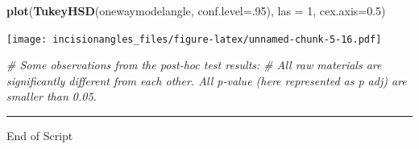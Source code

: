 \documentclass[
]{article}
\newenvironment{Shaded}{\begin{snugshade}}{\end{snugshade}}
\newcommand{\AttributeTok}[1]{\textcolor[rgb]{0.13,0.29,0.53}{#1}}
\newcommand{\CommentTok}[1]{\textcolor[rgb]{0.56,0.35,0.01}{\textit{#1}}}
\newcommand{\DecValTok}[1]{\textcolor[rgb]{0.00,0.00,0.81}{#1}}
\newcommand{\FloatTok}[1]{\textcolor[rgb]{0.00,0.00,0.81}{#1}}
\newcommand{\FunctionTok}[1]{\textcolor[rgb]{0.13,0.29,0.53}{\textbf{#1}}}
\newcommand{\NormalTok}[1]{#1}
\begin{document}
\begin{Shaded}
\begin{Highlighting}[]
\FunctionTok{plot}\NormalTok{(}\FunctionTok{TukeyHSD}\NormalTok{(onewaymodelangle, }\AttributeTok{conf.level=}\NormalTok{.}\DecValTok{95}\NormalTok{), }\AttributeTok{las =} \DecValTok{1}\NormalTok{, }\AttributeTok{cex.axis=}\FloatTok{0.5}\NormalTok{)}
\end{Highlighting}
\end{Shaded}

\texttt{[image: incisionangles\_files/figure-latex/unnamed-chunk-5-16.pdf]}

\begin{Shaded}
\begin{Highlighting}[]
\CommentTok{\# Some observations from the post{-}hoc test results:}
\CommentTok{\# All raw materials are significantly different from each other. All p{-}value (here represented as p adj) are smaller than 0.05.}
\end{Highlighting}
\end{Shaded}

\begin{center}\rule{0.5\linewidth}{0.5pt}\end{center}

End of Script
\end{document}
